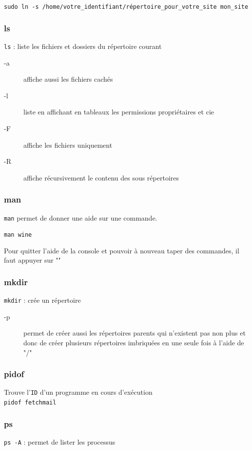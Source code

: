 \documentclass[a4paper,twoside]{article}
\begin{document}
\verb|sudo ln -s /home/votre_identifiant/répertoire_pour_votre_site mon_site|

\subsubsection{ls}
\verb|ls| : liste les fichiers et dossiers du répertoire courant
\begin{description}
 \item[-a] affiche aussi les fichiers cachés
\item[-l] liste en affichant en tableaux les permissions propriétaires et cie
\item[-F] affiche les fichiers uniquement
\item[-R] affiche récursivement le contenu des sous répertoires
\end{description}

\subsubsection{man}

\verb|man| permet de donner une aide sur une commande.

\begin{exemple}
\texttt{man wine}
\end{exemple}


Pour quitter l'aide de la console et pouvoir à nouveau taper des commandes, il faut appuyer sur ""

\subsubsection{mkdir}
\verb|mkdir| : crée un répertoire
\begin{description}
 \item[-p] permet de créer aussi les répertoires parents qui n'existent pas non plus et donc de créer plusieurs répertoires imbriquées en une seule fois à l'aide de "/"
\end{description}

\subsubsection{pidof}
Trouve l'\texttt{ID} d'un programme en cours d'exécution\\
\verb|pidof fetchmail|

\subsubsection{ps}
\verb|ps -A| : permet de lister les processus
\end{document}
